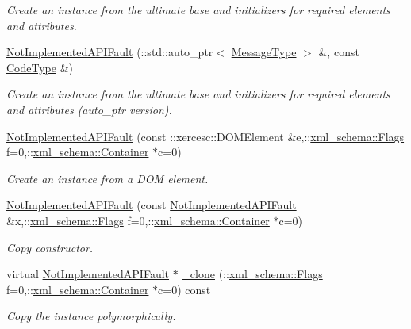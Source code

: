 \begin{DoxyCompactItemize}
\begin{DoxyCompactList}\small\item\em Create an instance from the ultimate base and initializers for required elements and attributes. \item\end{DoxyCompactList}\item 
\hyperlink{classopenstack_1_1xml_1_1NotImplementedAPIFault_add16891bb8af039b34a211c5a74e7778}{NotImplementedAPIFault} (::std::auto\_\-ptr$<$ \hyperlink{classopenstack_1_1xml_1_1CloudServersAPIFault_aff7b9d2067747fa033a0ea4408011af6}{MessageType} $>$ \&, const \hyperlink{classopenstack_1_1xml_1_1CloudServersAPIFault_aa9f350c9dba08ae375b2a61568551550}{CodeType} \&)
\begin{DoxyCompactList}\small\item\em Create an instance from the ultimate base and initializers for required elements and attributes (auto\_\-ptr version). \item\end{DoxyCompactList}\item 
\hyperlink{classopenstack_1_1xml_1_1NotImplementedAPIFault_a30ac24323b84a9c5d20ba7a92fb2ed8e}{NotImplementedAPIFault} (const ::xercesc::DOMElement \&e,::\hyperlink{namespacexml__schema_affb4c227cbd9aa7453dd1dc5a1401943}{xml\_\-schema::Flags} f=0,::\hyperlink{namespacexml__schema_a333dea2213742aea47a37532dec4ec27}{xml\_\-schema::Container} $\ast$c=0)
\begin{DoxyCompactList}\small\item\em Create an instance from a DOM element. \item\end{DoxyCompactList}\item 
\hyperlink{classopenstack_1_1xml_1_1NotImplementedAPIFault_a85ef55e6cb77bd95aed8e9d2cda8731c}{NotImplementedAPIFault} (const \hyperlink{classopenstack_1_1xml_1_1NotImplementedAPIFault}{NotImplementedAPIFault} \&x,::\hyperlink{namespacexml__schema_affb4c227cbd9aa7453dd1dc5a1401943}{xml\_\-schema::Flags} f=0,::\hyperlink{namespacexml__schema_a333dea2213742aea47a37532dec4ec27}{xml\_\-schema::Container} $\ast$c=0)
\begin{DoxyCompactList}\small\item\em Copy constructor. \item\end{DoxyCompactList}\item 
virtual \hyperlink{classopenstack_1_1xml_1_1NotImplementedAPIFault}{NotImplementedAPIFault} $\ast$ \hyperlink{classopenstack_1_1xml_1_1NotImplementedAPIFault_adbc35a672b84d97a2b6914926c1b6781}{\_\-clone} (::\hyperlink{namespacexml__schema_affb4c227cbd9aa7453dd1dc5a1401943}{xml\_\-schema::Flags} f=0,::\hyperlink{namespacexml__schema_a333dea2213742aea47a37532dec4ec27}{xml\_\-schema::Container} $\ast$c=0) const 
\begin{DoxyCompactList}\small\item\em Copy the instance polymorphically. \item\end{DoxyCompactList}\end{DoxyCompactItemize}


